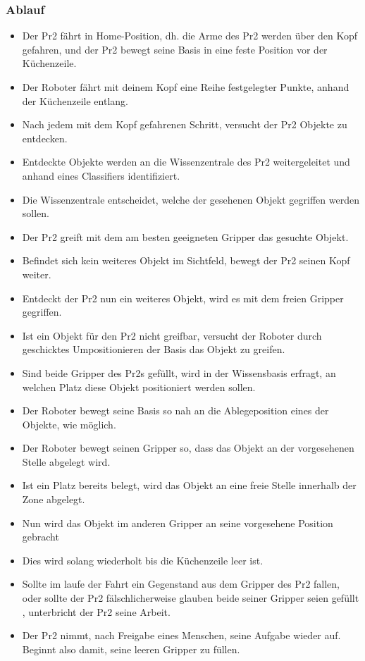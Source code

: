 \documentclass{suturo}
\begin{document}
\subsubsection{Ablauf}
\begin{itemize}
\item Der Pr2 fährt in Home-Position, dh. die Arme des Pr2 werden über den Kopf gefahren, und der Pr2 bewegt seine Basis in eine feste Position vor der Küchenzeile.
\item Der Roboter fährt mit deinem Kopf eine Reihe festgelegter Punkte, anhand der Küchenzeile entlang.
\item Nach jedem mit dem Kopf gefahrenen Schritt, versucht der Pr2 Objekte zu entdecken. 
\item Entdeckte Objekte werden an die Wissenzentrale des Pr2 weitergeleitet und anhand eines Classifiers identifiziert.
\item Die Wissenzentrale entscheidet, welche der gesehenen Objekt gegriffen werden sollen.
\item Der Pr2 greift mit dem am besten geeigneten Gripper das gesuchte Objekt. 
\item Befindet sich kein weiteres Objekt im Sichtfeld, bewegt der Pr2 seinen Kopf weiter. 
\item Entdeckt der Pr2 nun ein weiteres Objekt, wird es mit dem freien Gripper gegriffen.
\item Ist ein Objekt für den Pr2 nicht greifbar, versucht der Roboter durch geschicktes Umpositionieren der Basis das Objekt zu greifen.
\item Sind beide Gripper des Pr2s gefüllt, wird in der Wissensbasis erfragt, an welchen Platz diese Objekt positioniert werden sollen.
\item Der Roboter bewegt seine Basis so nah an die Ablegeposition eines der Objekte, wie möglich.
\item Der Roboter bewegt seinen Gripper so, dass das Objekt an der vorgesehenen Stelle abgelegt wird.
\item Ist ein Platz bereits belegt, wird das Objekt an eine freie Stelle innerhalb der Zone abgelegt.
\item Nun wird das Objekt im anderen Gripper an seine vorgesehene Position gebracht
\item Dies wird solang wiederholt bis die Küchenzeile leer ist.
\item Sollte im laufe der Fahrt ein Gegenstand aus dem Gripper des Pr2 fallen, oder sollte der Pr2 fälschlicherweise glauben beide seiner Gripper seien gefüllt , unterbricht der Pr2 seine Arbeit.
\item Der Pr2 nimmt, nach Freigabe eines Menschen, seine Aufgabe wieder auf. Beginnt also damit, seine leeren Gripper zu füllen.
\end{itemize}
\end{document}

